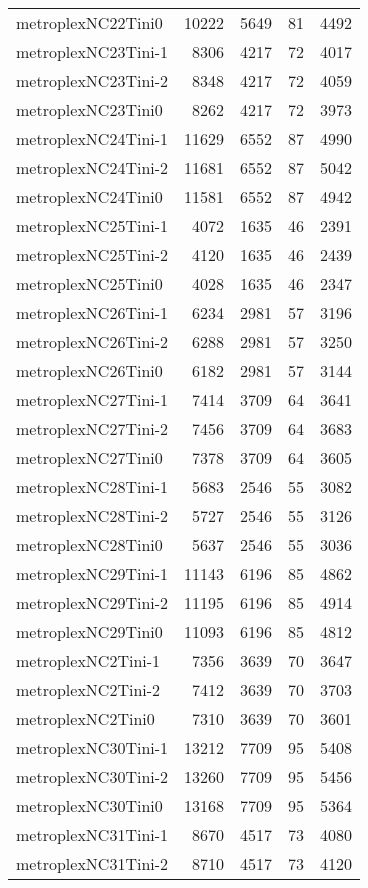 \documentclass[../../../thesis.tex]{subfiles}
\begin{document}
\begin{longtable}{lrrrr}
metroplexNC22Tini0 & 10222 & 5649 & 81 & 4492 \\
metroplexNC23Tini-1 & 8306 & 4217 & 72 & 4017 \\
metroplexNC23Tini-2 & 8348 & 4217 & 72 & 4059 \\
metroplexNC23Tini0 & 8262 & 4217 & 72 & 3973 \\
metroplexNC24Tini-1 & 11629 & 6552 & 87 & 4990 \\
metroplexNC24Tini-2 & 11681 & 6552 & 87 & 5042 \\
metroplexNC24Tini0 & 11581 & 6552 & 87 & 4942 \\
metroplexNC25Tini-1 & 4072 & 1635 & 46 & 2391 \\
metroplexNC25Tini-2 & 4120 & 1635 & 46 & 2439 \\
metroplexNC25Tini0 & 4028 & 1635 & 46 & 2347 \\
metroplexNC26Tini-1 & 6234 & 2981 & 57 & 3196 \\
metroplexNC26Tini-2 & 6288 & 2981 & 57 & 3250 \\
metroplexNC26Tini0 & 6182 & 2981 & 57 & 3144 \\
metroplexNC27Tini-1 & 7414 & 3709 & 64 & 3641 \\
metroplexNC27Tini-2 & 7456 & 3709 & 64 & 3683 \\
metroplexNC27Tini0 & 7378 & 3709 & 64 & 3605 \\
metroplexNC28Tini-1 & 5683 & 2546 & 55 & 3082 \\
metroplexNC28Tini-2 & 5727 & 2546 & 55 & 3126 \\
metroplexNC28Tini0 & 5637 & 2546 & 55 & 3036 \\
metroplexNC29Tini-1 & 11143 & 6196 & 85 & 4862 \\
metroplexNC29Tini-2 & 11195 & 6196 & 85 & 4914 \\
metroplexNC29Tini0 & 11093 & 6196 & 85 & 4812 \\
metroplexNC2Tini-1 & 7356 & 3639 & 70 & 3647 \\
metroplexNC2Tini-2 & 7412 & 3639 & 70 & 3703 \\
metroplexNC2Tini0 & 7310 & 3639 & 70 & 3601 \\
metroplexNC30Tini-1 & 13212 & 7709 & 95 & 5408 \\
metroplexNC30Tini-2 & 13260 & 7709 & 95 & 5456 \\
metroplexNC30Tini0 & 13168 & 7709 & 95 & 5364 \\
metroplexNC31Tini-1 & 8670 & 4517 & 73 & 4080 \\
metroplexNC31Tini-2 & 8710 & 4517 & 73 & 4120 \\

\end{longtable}
\end{document}
